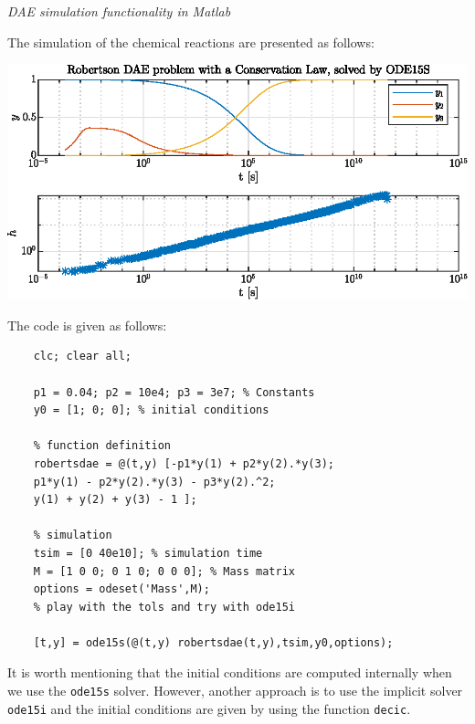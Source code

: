 \textit{DAE simulation functionality in Matlab}

The simulation of the chemical reactions are presented as follows:

\includegraphics[width=\textwidth]{Figures/Ugf233.eps}

The code is given as follows:

\begin{lstlisting}
	clc; clear all;
	
	p1 = 0.04; p2 = 10e4; p3 = 3e7; % Constants 
	y0 = [1; 0; 0]; % initial conditions
	
	% function definition
	robertsdae = @(t,y) [-p1*y(1) + p2*y(2).*y(3); 
	p1*y(1) - p2*y(2).*y(3) - p3*y(2).^2;
	y(1) + y(2) + y(3) - 1 ];
	
	% simulation
	tsim = [0 40e10]; % simulation time
	M = [1 0 0; 0 1 0; 0 0 0]; % Mass matrix
	options = odeset('Mass',M);
	% play with the tols and try with ode15i
	
	[t,y] = ode15s(@(t,y) robertsdae(t,y),tsim,y0,options);
\end{lstlisting}

It is worth mentioning that the initial conditions are computed internally when we use the \texttt{ode15s} solver. However, another approach is to use the implicit solver \texttt{ode15i} and the initial conditions are given by using the function \texttt{decic}.